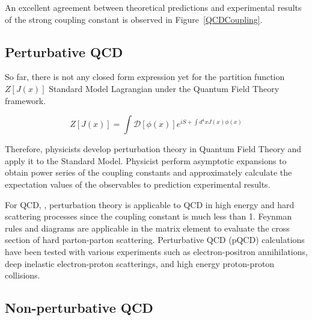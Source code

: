 An excellent agreement between theoretical predictions and experimental results of the strong coupling constant is observed in Figure~\ref{QCDCoupling}. 

\subsection{Perturbative QCD}


So far, there is not any closed form expression yet for the partition function $Z[J(x)]$ Standard Model Lagrangian under the Quantum Field Theory framework.

\begin{equation}
Z[J(x)] = \int \mathcal{D}[\phi(x)] e^{iS + \int d^4 x J(x) \phi(x)}
\end{equation}

Therefore, physicists develop perturbation theory in Quantum Field Theory and apply it to the Standard Model. Physicist perform asymptotic expansions to obtain power series of the coupling constants and approximately calculate the expectation values of the observables to prediction experimental results.

For QCD, ,  perturbation theory is applicable to QCD in high energy and hard scattering processes since the coupling constant is much less than 1. Feynman rules and diagrams are applicable in the matrix element to evaluate the cross section of hard parton-parton scattering. Perturbative QCD (pQCD) calculations have been tested with various experiments such as electron-positron annihilations, deep inelastic electron-proton scatterings, and high energy proton-proton collisions.

\subsection{Non-perturbative QCD}

